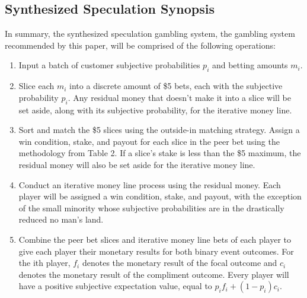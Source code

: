 \documentclass[sn-mathphys-num]{sn-jnl}
\theoremstyle{thmstyleone}%
\theoremstyle{thmstyletwo}%
\theoremstyle{thmstylethree}%
\begin{document}
\subsection{Synthesized Speculation Synopsis}

In summary, the synthesized speculation gambling system, the gambling system recommended by this paper, will be comprised of the following operations:

\begin{enumerate}[label=\textbf{\arabic*})]

\vspace{.05in}
\item Input a batch of customer subjective probabilities $p_i$ and betting amounts $m_i$.
\vspace{.05in}

\item Slice each $m_i$ into a discrete amount of \$5 bets, each with the subjective probability $p_i$. Any residual money that doesn't make it into a slice will be set aside, along with its subjective probability, for the iterative money line. 
\vspace{.05in}

\item Sort and match the \$5 slices using the outside-in matching strategy. Assign a win condition, stake, and payout for each slice in the peer bet using the methodology from Table 2. If a slice's stake is less than the \$5 maximum, the residual money will also be set aside for the iterative money line. 
\vspace{.05in}

\item Conduct an iterative money line process using the residual money. Each player will be assigned a win condition, stake, and payout, with the exception of the small minority whose subjective probabilities are in the drastically reduced no man's land.
\vspace{.05in}

\item Combine the peer bet slices and iterative money line bets of each player to give each player their monetary results for both binary event outcomes. For the ith player, $f_i$ denotes the monetary result of the focal outcome and $c_i$ denotes the monetary result of the compliment outcome. Every player will have a positive subjective expectation value, equal to $p_i f_i + (1-p_i) c_i$.
\vspace{.05in}
\end{enumerate}
\end{document}
